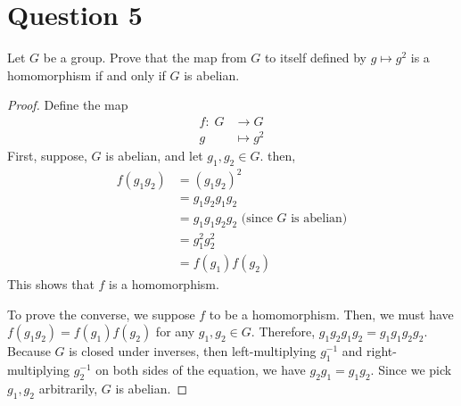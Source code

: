 \section{Question 5}

\begin{question}
    Let $G$ be a group. Prove that the map from $G$ to itself defined by $g \mapsto g^2$ is a homomorphism if and only if $G$ is abelian.
\end{question}

\begin{answer}
    \begin{proof}
        Define the map
        \begin{equation}
            \begin{aligned}
                f: \; G &\to G\\
                g &\mapsto g^2
            \end{aligned}
        \end{equation}
        First, suppose, $G$ is abelian, and let $g_1,g_2\in G$. then,
        \begin{equation}
            \begin{aligned}
                f(g_1g_2) &= (g_1g_2)^2\\
                &= g_1g_2g_1g_2\\
                &= g_1g_1g_2g_2 \text{ (since $G$ is abelian)}\\
                &= g_1^2g_2^2\\
                &= f(g_1)f(g_2)
            \end{aligned}
        \end{equation}
        This shows that $f$ is a homomorphism.
        
        To prove the converse, we suppose $f$ to be a homomorphism. Then, we must have $f(g_1g_2) = f(g_1)f(g_2)$ for any $g_1,g_2 \in G$. Therefore, $g_1g_2g_1g_2=g_1g_1g_2g_2$. Because $G$ is closed under inverses, then left-multiplying $g_1^{-1}$ and right-multiplying $g_2^{-1}$ on both sides of the equation, we have $g_2g_1=g_1g_2$. Since we pick $g_1,g_2$ arbitrarily, $G$ is abelian.
    \end{proof}
\end{answer}